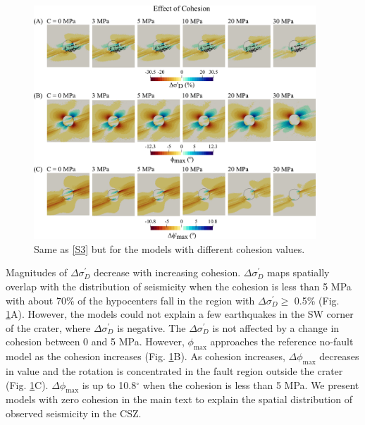 \documentclass[draft,jgrga]{agutexSI2019}
\begin{document}
\begin{article}
\begin{figure}[ht]
\includegraphics[width=25pc]{Figures/SD70R25C_S6.png}
\caption{Same as \ref{S3} but for the models with different cohesion values.}
\label{S6}
\end{figure}


Magnitudes of $\Delta\sigma_D^{\prime}$ decrease with increasing cohesion. $\Delta\sigma_D^{\prime}$ maps spatially overlap with the distribution of seismicity when the cohesion is less than 5 MPa with about 70\% of the hypocenters fall in the region with $\Delta\sigma_D^{\prime} \ge$ 0.5\% (Fig. \ref{S6}A). However, the models could not explain a few earthquakes in the SW corner of the crater, where $\Delta\sigma_D^{\prime}$ is negative. The $\Delta\sigma_D^{\prime}$ is not affected by a change in cohesion between 0 and 5 MPa. However, $\phi_{\max}$ approaches the reference no-fault model as the cohesion increases (Fig. \ref{S6}B). As cohesion increases, $\Delta\phi_{\max}$ decreases in value and the rotation is concentrated in the fault region outside the crater (Fig. \ref{S6}C). $\Delta\phi_{\max}$ is up to 10.8$^\circ$ when the cohesion is less than 5 MPa. We present models with zero cohesion in the main text to explain the spatial distribution of observed seismicity in the CSZ.















\end{article}
\end{document}
